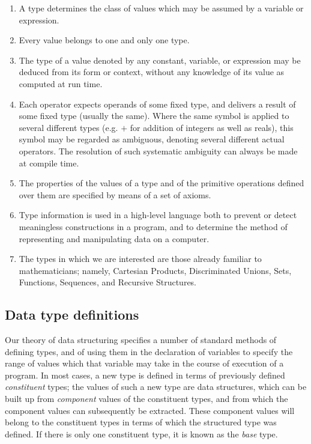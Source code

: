\documentclass[twoside,11pt]{book}
\begin{document}
\begin{enumerate}[wide, nosep, label=(\arabic*)]
	\item A type determines the class of values which may be assumed by a variable or expression.
	\item Every value belongs to one and only one type.
	\item The type of a value denoted by any constant, variable, or expression may be deduced from its form or context, without any knowledge of its value as computed at run time.
	\item Each operator expects operands of some fixed type, and delivers a result of some fixed type (usually the same). Where the same symbol is applied to several different types (e.g. $+$ for addition of integers as well as reals), this symbol may be regarded as ambiguous, denoting several different actual operators. The resolution of such systematic ambiguity can always be made 	at compile time.
	\item  The properties of the values of a type and of the primitive operations defined over them are specified by means of a set of axioms.
	\item Type information is used in a high-level language both to prevent or detect meaningless constructions in a program, and to determine the method of representing and manipulating data on a computer.
	\item The types in which we are interested are those already familiar to mathematicians; namely, Cartesian Products, Discriminated Unions, Sets, Functions, Sequences, and Recursive Structures.
\end{enumerate}

\subsection{Data type definitions}

Our theory of data structuring specifies a number of standard methods of defining types, and of using them in the declaration of variables to specify the range of values which that variable may take in the course of execution of a program. In most cases, a new type is defined in terms of previously defined \textit{constituent} types; the values of such a new type are data structures, which can be built up from \textit{component} values of the constituent types, and from which the component values can subsequently be extracted. These component values will belong to the constituent types in terms of which the structured type was defined. If there is only one constituent type, it is known as the \textit{base} type.
\end{document}
